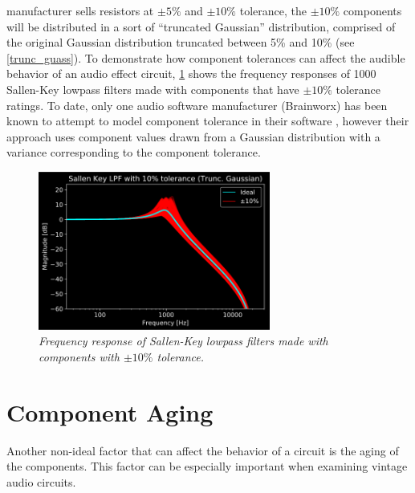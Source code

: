 \documentclass[twoside,a4paper]{article}
\begin{document}
manufacturer sells resistors at $\pm 5\%$ and $\pm 10\%$ tolerance,
the $\pm 10\%$ components will be distributed in a sort of ``truncated
Gaussian'' distribution, comprised of the original Gaussian
distribution truncated between 5\% and 10\% (see \cref{trunc_guass}).
To demonstrate how component tolerances can affect the audible behavior
of an audio effect circuit, \cref{tol_LPF} shows the frequency responses
of 1000 Sallen-Key lowpass filters made with components that have
$\pm 10\%$ tolerance ratings. To date, only one audio software manufacturer
(Brainworx) has been known to attempt to model component tolerance in
their software \cite{BrainWorksTMT}, however their approach uses component
values drawn from a Gaussian distribution with a variance corresponding
to the component tolerance.
%
\begin{figure}[h]
    \center
    \includegraphics[width=3in]{../CMTolerance/Pics/lpf_tgauss_plot.png}
    \caption{\label{tol_LPF}{\it Frequency response of Sallen-Key lowpass
            filters made with components with $\pm 10\%$ tolerance.}}
\end{figure}
%
\section{Component Aging} \label{sec:age}
%
Another non-ideal factor that can affect the behavior of a circuit is
the aging of the components. This factor can be especially important
when examining vintage audio circuits.
%
\end{document}
